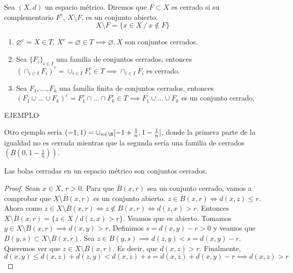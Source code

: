 \begin{ndef}
  Sea $(X,d)$ un espacio métrico. Diremos que $F \subset X$ es cerrado si su complementario $F^c$, $X \setminus F$, es un conjunto abierto. \[ X\setminus F = \{x \in X\ /\ x \notin F\}\]
  \begin{enumerate}
    \item $\varnothing ^c=X \in T$, $X^c=\varnothing \in T\implies \varnothing ,X$ son conjuntos cerrados.
    \item Sea $\{F_i\}_{i \in I}$ una familia de conjuntos cerrados, entonces $(\cap_{i \in I}F_i)^c = \cup_{i \in I}F_i^c \in T \implies \cap_{i \in I}F_i$ es cerrado.
    \item Sea $F_1,\ldots,F_k$ una familia finita de conjuntos cerrados, entonces $(F_1 \cup \ldots \cup F_k)^c=F_1^c \cap \ldots \cap F_k^c \in T \implies F_1 \cup \ldots \cup F_k$ es un conjunto cerrado.
  \end{enumerate}
  EJEMPLO
  \begin{exmp}
    Otro ejemplo sería $(-1,1)=\cup_{n \in \N}[-1+\frac{1}{n},1-\frac{1}{n}]$, donde la primera parte de la igualdad no es cerrada mientras que la segunda sería una familia de cerrados $(\overline{B}(0,1-\frac{1}{n}))$.
  \end{exmp}
\end{ndef}

\begin{properties}
  Las bolas cerradas en un espacio métrico son conjuntos cerrados.
\end{properties}
\begin{proof}
  Sean $x \in X$, $r>0$. Para que $\overline{B}(x,r)$ sea un conjunto cerrado, vamos a comprobar que $X \setminus \overline{B}(x,r)$ es un conjunto abierto. $z \in \overline{B}(x,r) \Leftrightarrow d(x,z) \leq r$. Ahora como $z \in X \setminus \overline{B}(x,r) \Leftrightarrow z \notin  \overline{B}(x,r) \Leftrightarrow d(z,x)>r$. Entonces $X \setminus \overline{B}(x,r) = \{z \in X\ /\ d(z,x)>r\}$. Veamos que es abierto. Tomamos $y \in X \setminus \overline{B}(x,r) \implies d(x,y)>r$. Definimos $s=d(x,y)-r>0$ y veamos que $B(y,s) \subset X \setminus \overline{B}(x,r)$. Sea $z \in B(y,s) \implies d(z,y)<s=d(x,y)-r$. Queremos ver que $z \in X \setminus \overline{B}(x,r)$. Es decir, que $d(x,z)>r$. Finalmente, \[d(x,y) \le d(x,z) + d(z,y) < d(x,z) + s= d(x,z)+d(x,y)-r \implies d(x,z)>r\]
\end{proof}

